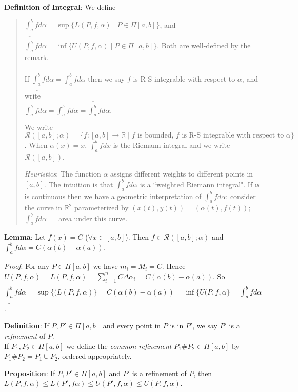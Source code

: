 \documentclass[11pt]{article}
\begin{document}
\textbf{Definition of Integral}: We define
\begin{quote}\vspace{-0.3cm}
$\underline{\int_a^b} f d\alpha = \sup \{L(P, f, \alpha) \;|\; P \in \Pi[a,b]\}$, and $\overline{\int_a^b} f d\alpha = \inf \{U(P, f, \alpha) \;|\; P \in \Pi[a,b]\}$. Both are well-defined by the remark.

If $\underline{\int_a^b} f d\alpha = \overline{\int_a^b} f d\alpha$ then we say $f$ is R-S integrable with respect to $\alpha$, and write\\ $\int_a^b f d\alpha = \underline{\int_a^b} f d\alpha = \overline{\int_a^b} f d\alpha$.\\

We write $\mathcal{R}([a,b]; \alpha) = \{f : [a,b] \to \mathbb{R} \;|\; f \text{ is bounded, } f \text{ is R-S integrable with respect to }\alpha\}$. When $\alpha(x) = x$, $\int_a^b f dx$ is the Riemann integral and we write $\mathcal{R}([a,b])$.

\emph{Heuristics}: The function $\alpha$ assigns different weights to different points in $[a,b]$. The intuition is that $\int_a^b f d\alpha$ is a ``weighted Riemann integral". If $\alpha$ is continuous then we have a geometric interpretation of $\int_a^b f d \alpha$: consider the curve in $\mathbb{R}^2$ parameterized by $(x(t), y(t)) = (\alpha(t), f(t))$; $\int_a^b f d\alpha =$ area under this curve.
\end{quote}

\textbf{Lemma}: Let $f(x) = C$ ($\forall x \in [a,b]$). Then $f \in \mathcal{R}([a,b]; \alpha)$ and $\int_a^b f d\alpha = C(\alpha(b) - \alpha(a))$.

\emph{Proof}: For any $P \in \Pi[a,b]$ we have $m_i = M_i = C$. Hence $U(P, f, \alpha) = L(P, f, \alpha) = \sum_{i=1}^n C \Delta \alpha_i = C(\alpha(b) - \alpha(a))$. So $\underline{\int_a^b} f d\alpha = \sup \{(L(P, f, \alpha)\} = C(\alpha(b) - \alpha(a)) = \inf \{U(P, f, \alpha\} = \overline{\int_a^b} f d\alpha$.

\textbf{Definition}: If $P, P' \in \Pi[a,b]$ and every point in $P$ is in $P'$, we say $P'$ is a \emph{refinement} of $P$.\\
If $P_1, P_2 \in \Pi[a,b]$ we define the \emph{common refinement} $P_1 \# P_2 \in \Pi[a,b]$ by $P_1 \# P_2 = P_1 \cup P_2$, ordered appropriately.

\textbf{Proposition}: If $P, P' \in \Pi[a,b]$ and $P'$ is a refinement of $P$, then $L(P, f, \alpha) \leq L(P', f \alpha) \leq U(P', f, \alpha) \leq U(P, f, \alpha)$.\\
\end{document}
